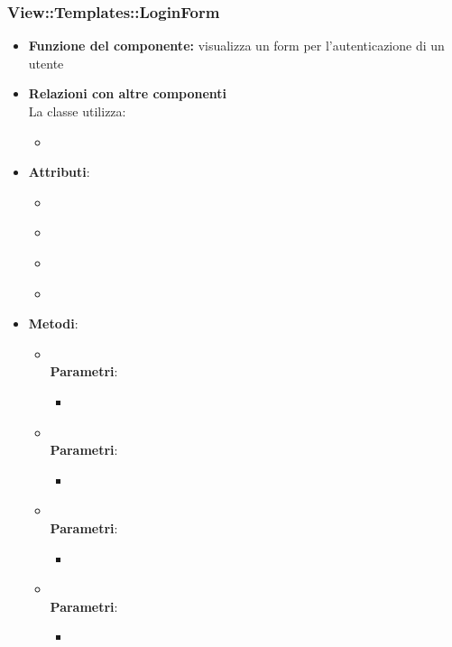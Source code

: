  \subsubsection{View::Templates::LoginForm}
 \begin{itemize}
 \item\textbf{Funzione del componente:} visualizza un form per l'autenticazione di un utente
 \item\textbf{Relazioni con altre componenti}\\
 La classe utilizza:
 	\begin{itemize}
 		\item
 	\end{itemize}
 \item\textbf{Attributi}:
 	\begin{itemize}
 		\item\code{}\\
 		\item\code{}\\
 		\item\code{}\\
 		\item\code{}\\
 	\end{itemize}
 \item\textbf{Metodi}:
 	\begin{itemize}
 		\item\code{}\\
 		\textbf{Parametri}:
 			\begin{itemize}
 				\item\code{}\\
 			\end{itemize}
 		\item\code{}\\
 		\textbf{Parametri}:
 			\begin{itemize}
 				\item\code{}\\
 			\end{itemize}
 		\item\code{}\\
 		\textbf{Parametri}:
 			\begin{itemize}
 				\item\code{}\\
 			\end{itemize}
 		\item\code{}\\
 		\textbf{Parametri}:
 			\begin{itemize}
 				\item\code{}\\
 			\end{itemize}
 	\end{itemize}
 \end{itemize}
 
